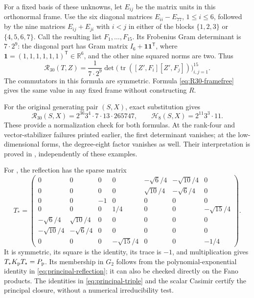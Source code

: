 \documentclass[11pt,a4paper]{article}
\newcommand{\RR}{\mathbb R}
\begin{document}
For a fixed basis of these unknowns, let $E_{ij}$ be the matrix units in this orthonormal frame.  Use the six diagonal matrices $E_{ii}-E_{77}$, $1\le i\le6$, followed by the nine matrices $E_{ij}+E_{ji}$ with $i<j$ in either of the blocks $\{1,2,3\}$ or $\{4,5,6,7\}$.  Call the resulting list $F_1,\ldots,F_{15}$.  Its Frobenius Gram determinant is $7\cdot2^9$: the diagonal part has Gram matrix $I_6+\boldsymbol1\boldsymbol1^{\mathsf T}$, where $\boldsymbol1=(1,1,1,1,1,1)^{\mathsf T}\in\RR^6$, and the other nine squared norms are two.  Thus
\begin{equation}
\mathcal R_{30}(T,Z)
=\frac{1}{7\cdot2^9}\det\bigl(\operatorname{tr}([Z',F_i][Z',F_j])\bigr)_{i,j=1}^{15}.
\label{eq:explicit15}
\end{equation}
The commutators in this formula are symmetric.  Formula \eqref{eq:R30-framefree} gives the same value in any fixed frame without constructing $R$.

For the original generating pair $(S,X)$, exact substitution gives
\[
\mathcal R_{30}(S,X)=2^{36}3^4\cdot7\cdot13\cdot265747,
\qquad
\mathcal H_8(S,X)=2^{11}3^3\cdot11.
\]
These provide a normalization check for both formulas.  At the rank-four and vector-stabilizer failures printed earlier, the first determinant vanishes; at the low-dimensional forms, the degree-eight factor vanishes as well.  Their interpretation is proved in , independently of these examples.

For , the reflection has the sparse matrix
\[
T_*=\begin{pmatrix}
0&0&0&0&-\sqrt6/4&-\sqrt{10}/4&0\\
0&0&0&0&\sqrt{10}/4&-\sqrt6/4&0\\
0&0&-1&0&0&0&0\\
0&0&0&1/4&0&0&-\sqrt{15}/4\\
-\sqrt6/4&\sqrt{10}/4&0&0&0&0&0\\
-\sqrt{10}/4&-\sqrt6/4&0&0&0&0&0\\
0&0&0&-\sqrt{15}/4&0&0&-1/4
\end{pmatrix}.
\]
It is symmetric, its square is the identity, its trace is $-1$, and multiplication gives $T_*K_{\rm p}T_*=P_{\rm p}$.  Its membership in $G_2$ follows from the polynomial-exponential identity in \eqref{eq:principal-reflection}; it can also be checked directly on the Fano products.  The identities in \eqref{eq:principal-triple} and the scalar Casimir certify the principal closure, without a numerical irreducibility test.
\end{document}
